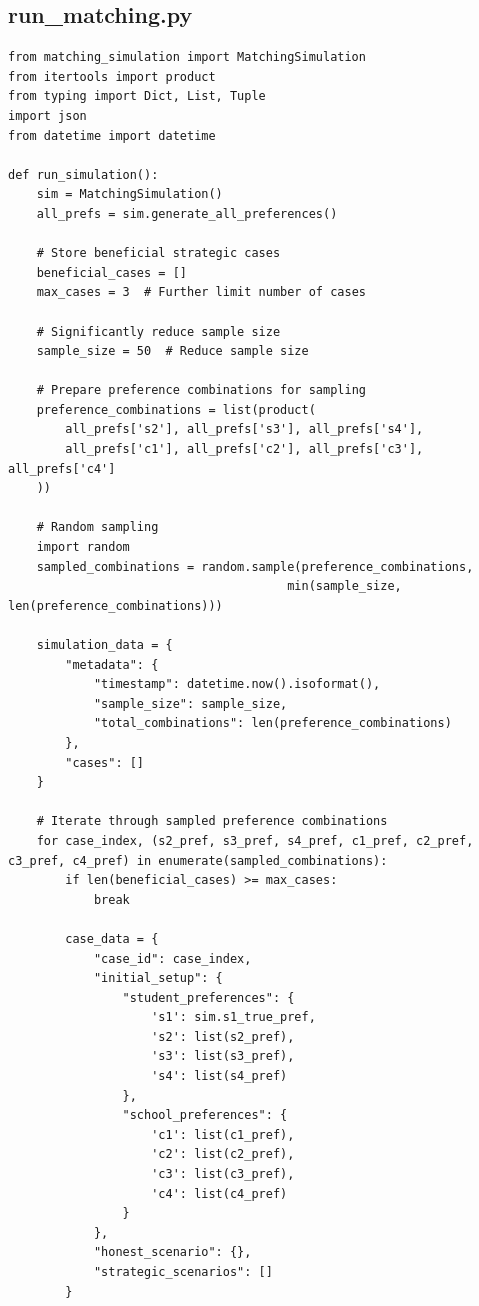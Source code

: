 \documentclass{article}
\begin{document}
\subsection{run\_matching.py}
\begin{verbatim}
from matching_simulation import MatchingSimulation
from itertools import product
from typing import Dict, List, Tuple
import json
from datetime import datetime

def run_simulation():
    sim = MatchingSimulation()
    all_prefs = sim.generate_all_preferences()
    
    # Store beneficial strategic cases
    beneficial_cases = []
    max_cases = 3  # Further limit number of cases
    
    # Significantly reduce sample size
    sample_size = 50  # Reduce sample size
    
    # Prepare preference combinations for sampling
    preference_combinations = list(product(
        all_prefs['s2'], all_prefs['s3'], all_prefs['s4'],
        all_prefs['c1'], all_prefs['c2'], all_prefs['c3'], all_prefs['c4']
    ))
    
    # Random sampling
    import random
    sampled_combinations = random.sample(preference_combinations, 
                                       min(sample_size, len(preference_combinations)))
    
    simulation_data = {
        "metadata": {
            "timestamp": datetime.now().isoformat(),
            "sample_size": sample_size,
            "total_combinations": len(preference_combinations)
        },
        "cases": []
    }
    
    # Iterate through sampled preference combinations
    for case_index, (s2_pref, s3_pref, s4_pref, c1_pref, c2_pref, c3_pref, c4_pref) in enumerate(sampled_combinations):
        if len(beneficial_cases) >= max_cases:
            break
            
        case_data = {
            "case_id": case_index,
            "initial_setup": {
                "student_preferences": {
                    's1': sim.s1_true_pref,
                    's2': list(s2_pref),
                    's3': list(s3_pref),
                    's4': list(s4_pref)
                },
                "school_preferences": {
                    'c1': list(c1_pref),
                    'c2': list(c2_pref),
                    'c3': list(c3_pref),
                    'c4': list(c4_pref)
                }
            },
            "honest_scenario": {},
            "strategic_scenarios": []
        }
        

\end{verbatim}
\end{document}
